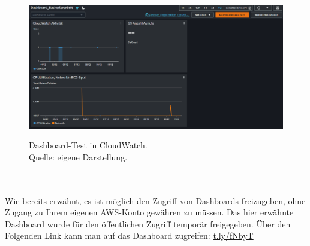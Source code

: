 \begin{figure}[h!]
  \centering
  \includegraphics[scale=0.4]{sources/CloudWatchDashboardTest}
  \caption[Dashboard-Test in CloudWatch]{}
  \label{fig:CloudWatchDashboardTest} 
  Dashboard-Test in CloudWatch.\\
  Quelle: eigene Darstellung.
\end{figure}
\\\\
Wie bereits erwähnt, es ist möglich den Zugriff von Dashboards freizugeben, ohne Zugang zu Ihrem eigenen AWS-Konto gewähren zu müssen. Das hier erwähnte Dashboard wurde für den öffentlichen Zugriff temporär freigegeben. Über den Folgenden Link kann man auf das Dashboard zugreifen: \url{t.ly/fNbyT} %
